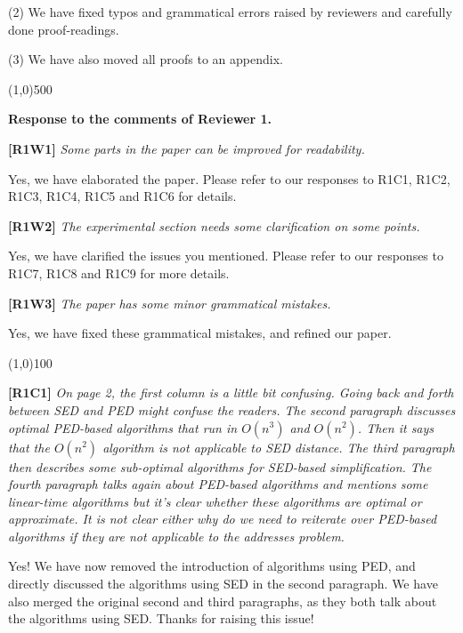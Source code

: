 \documentclass{letter}
\begin{document}
(2) We have fixed typos and grammatical errors raised by reviewers and carefully done proof-readings.

(3) We have also moved all proofs to an appendix.


\line(1,0){500}

\textbf{Response to the comments of Reviewer 1.}

\textbf{[R1W1]} \emph{Some parts in the paper can be improved for readability.}

Yes, we have elaborated the paper. Please refer to our responses to R1C1, R1C2, R1C3, R1C4, R1C5 and R1C6 for details.

\textbf{[R1W2]} \emph{The experimental section needs some clarification on some points.}

Yes, we have clarified the issues you mentioned. Please refer to our responses to R1C7, R1C8 and R1C9 for more details.

\textbf{[R1W3]} \emph{The paper has some minor grammatical mistakes.}

Yes, we have fixed these grammatical mistakes, and refined our paper.

\line(1,0){100}

\textbf{[R1C1]} \emph{On page 2, the first column is a little bit confusing. Going back and forth between SED and PED might confuse the readers. The second paragraph discusses optimal PED-based algorithms that run in $O(n^3)$ and $O(n^2)$. Then it says that the $O(n^2)$ algorithm is not applicable to SED distance. The third paragraph then describes some sub-optimal algorithms for SED-based simplification. {The fourth paragraph talks again about PED-based algorithms and mentions some linear-time algorithms but it's clear whether these algorithms are optimal or approximate. It is not clear either why do we need to reiterate over PED-based algorithms if they are not applicable to the addresses problem.}}

Yes! We have now removed the introduction of algorithms using PED, and directly discussed the algorithms using SED in the second paragraph. We have also merged the original second and third paragraphs, as they both talk about the algorithms using SED. Thanks for raising this issue!
\end{document}
